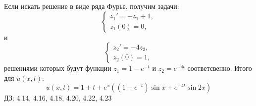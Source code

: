 \documentclass[11pt]{article}
\begin{document}
Если искать решение в виде ряда Фурье, получим задачи:
\begin{equation}
\begin{cases}
z_1' = -z_1 + 1, \\
z_1(0) = 0,
\end{cases}
\end{equation}
и
\begin{equation}
\begin{cases}
z_2' = -4z_2, \\
z_2(0) = 1,
\end{cases}
\end{equation}
решениями которых будут функции $z_1 = 1 - e^{-t}$ и $z_2 = e^{-4t}$ соответсвенно. Итого для $u(x, t)$:
\begin{equation}
u(x, t) = 1 + t + e^x((1 - e^{-t})\sin x + e^{-4t}\sin 2x)
\end{equation}
ДЗ: 4.14, 4.16, 4.18, 4.20, 4.22, 4.23
\end{document}
